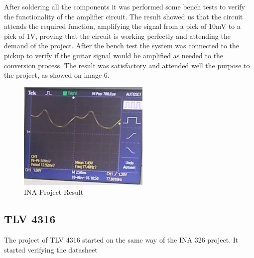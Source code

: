 After soldering all the components it was performed some bench tests to verify the functionality of the amplifier circuit. The result showed us that the circuit attends the required function, amplifying the signal from a pick of 10mV to a pick of 1V, proving that the circuit is working perfectly and attending the demand of the project. After the bench test the system was connected to the pickup to verify if the guitar signal would be amplified as needed to the conversion process. The result was satisfactory and attended well the purpose to the project, as showed on image 6.  

\begin{figure}[!htpb]
\centering
\includegraphics[scale=1]{textual-elements/hardware/INA_result}
\caption{INA Project Result}
\end{figure}

\subsection{TLV 4316}
The project of TLV 4316 started on the same way of the INA 326 project. It started verifying the datasheet 